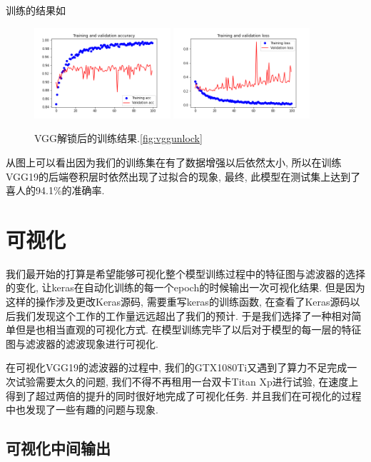 \documentclass[lang=cn,11pt]{elegantpaper}
\begin{document}
训练的结果如 

\begin{figure}[hbt]
\centering
 \includegraphics[width=0.45\textwidth]{VGG_19_unlocked_1}
  \includegraphics[width=0.45\textwidth]{VGG_19_unlocked_2}
 \caption{VGG解锁后的训练结果.\ref{fig:vggunlock}}
\end{figure}

从图上可以看出因为我们的训练集在有了数据增强以后依然太小, 所以在训练VGG19的后端卷积层时依然出现了过拟合的现象, 最终, 此模型在测试集上达到了喜人的94.1\%的准确率.

\section{可视化}

我们最开始的打算是希望能够可视化整个模型训练过程中的特征图与滤波器的选择的变化, 让keras在自动化训练的每一个epoch的时候输出一次可视化结果. 但是因为这样的操作涉及更改Keras源码, 需要重写keras的训练函数, 在查看了Keras源码以后我们发现这个工作的工作量远远超出了我们的预计. 于是我们选择了一种相对简单但是也相当直观的可视化方式. 在模型训练完毕了以后对于模型的每一层的特征图与滤波器的滤波现象进行可视化.

在可视化VGG19的滤波器的过程中, 我们的GTX1080Ti又遇到了算力不足完成一次试验需要太久的问题, 我们不得不再租用一台双卡Titan Xp进行试验, 在速度上得到了超过两倍的提升的同时很好地完成了可视化任务. 并且我们在可视化的过程中也发现了一些有趣的问题与现象.

\subsection{可视化中间输出}
\end{document}
